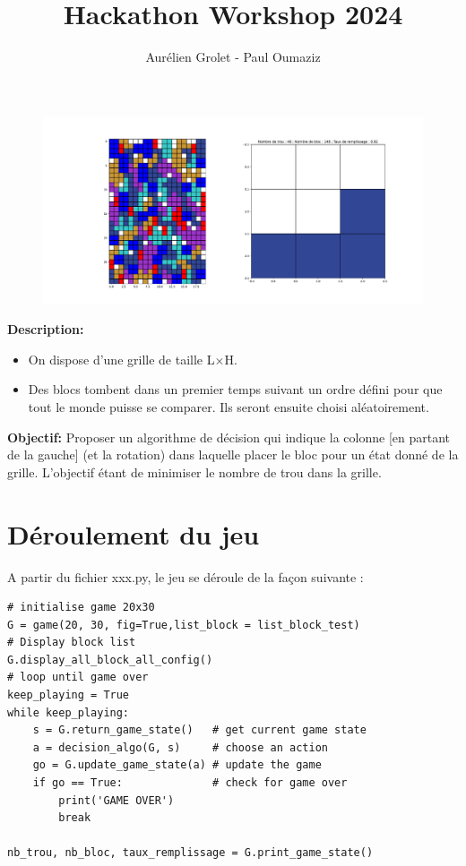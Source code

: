 \documentclass[10pt,a4paper]{article}
\title{Hackathon Workshop 2024}
\author{Aurélien Grolet - Paul Oumaziz}
\begin{document}
\begin{figure}[ht!]
	\centering
	\includegraphics[width=\textwidth]{exemple_grille.pdf}
\end{figure}

\noindent\textbf{Description:}
\begin{itemize}
	\item On dispose d'une grille de taille L$\times$H.
	\item Des blocs tombent dans un premier temps suivant un ordre défini pour que tout le monde puisse se comparer. Ils seront ensuite choisi aléatoirement.
\end{itemize}
\medskip



\noindent\textbf{Objectif:} Proposer un algorithme de décision qui indique la colonne [en partant de la gauche] (et la rotation) dans laquelle placer le bloc pour un état donné de la grille. L'objectif étant de minimiser le nombre de trou dans la grille.

\section*{Déroulement du jeu}

A partir du fichier xxx.py, le jeu se déroule de la façon suivante :

\begin{verbatim}
# initialise game 20x30
G = game(20, 30, fig=True,list_block = list_block_test)
# Display block list
G.display_all_block_all_config()
# loop until game over
keep_playing = True
while keep_playing:
	s = G.return_game_state()   # get current game state
	a = decision_algo(G, s)     # choose an action
	go = G.update_game_state(a) # update the game
	if go == True:              # check for game over
		print('GAME OVER')
		break

nb_trou, nb_bloc, taux_remplissage = G.print_game_state()
\end{verbatim}
\end{document}
